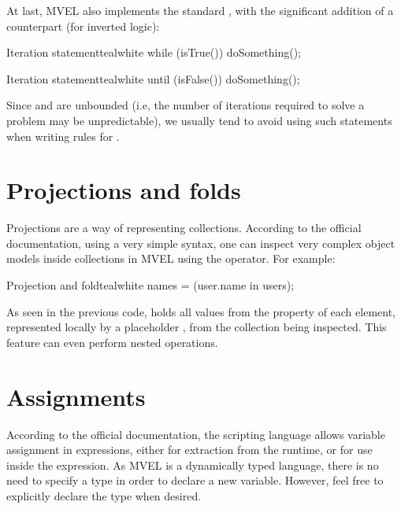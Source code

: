At last, MVEL also implements the standard , with the significant addition of a  counterpart (for inverted logic):

\begin{codebox}{Iteration statement}{teal}{\icnote}{white}
while (isTrue()) {
   doSomething();
}
\end{codebox}

\begin{codebox}{Iteration statement}{teal}{\icnote}{white}
until (isFalse()) {
   doSomething();
}
\end{codebox}

Since  and  are unbounded (i.e, the number of iterations required to solve a problem may be unpredictable), we usually tend to avoid using such statements when writing rules for \arara.

\section{Projections and folds}
\label{sec:mvelprojectionsandfolds}

Projections are a way of representing collections. According to the official documentation, using a very simple syntax, one can inspect very complex object models inside collections in MVEL using the  operator. For example:

\begin{codebox}{Projection and fold}{teal}{\icnote}{white}
names = (user.name in users);
\end{codebox}

As seen in the previous code,  holds all values from the  property of each element, represented locally by a placeholder , from the collection  being inspected. This feature can even perform nested operations.

\section{Assignments}
\label{sec:mvelassignments}

According to the official documentation, the scripting language allows variable assignment in expressions, either for extraction from the runtime, or for use inside the expression. As MVEL is a dynamically typed language, there is no need to specify a type in order to declare a new variable. However, feel free to explicitly declare the type when desired.

